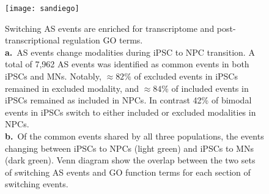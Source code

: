 \begin{figure}[h] 
  \centering
  \texttt{[image: sandiego]}
  \caption[Switching AS events are enriched for transcriptome and post-transcriptional regulation GO terms.]{
  Switching AS events are enriched for transcriptome and post-transcriptional regulation GO terms.\\
\textbf{a.}~AS events change modalities during iPSC to NPC transition. A total of 7,962 AS events was identified as common events in both iPSCs and MNs. Notably, $\approx 82\%$ of excluded events in iPSCs remained in excluded modality, and $\approx 84\%$ of included events in iPSCs remained as included in NPCs. In contrast 42\% of bimodal events in iPSCs switch to either included or excluded modalities in NPCs.\\
\textbf{b.}~Of the common events shared by all three populations, the events changing between iPSCs to NPCs (light green) and iPSCs to MNs (dark green). Venn diagram show the overlap between the two sets of switching AS events and GO function terms for each section of switching events.\\
}
\label{fig:switching_events}
\end{figure}


